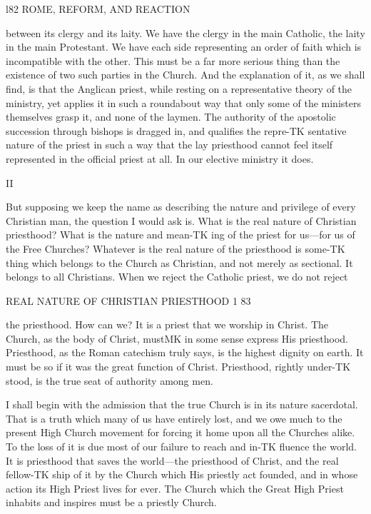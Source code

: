 \documentclass[12pt,a5paper,twoside]{book}
\begin{document}
{l82 ROME, REFORM, AND REACTION 

between its clergy and its laity. We have the clergy 
in the main Catholic, the laity in the main Protestant. 
We have each side representing an order of faith which 
is incompatible with the other. This must be a far 
more serious thing than the existence of two such 
parties in the Church. And the explanation of it, 
as we shall find, is that the Anglican priest, while 
resting on a representative theory of the ministry, yet 
applies it in such a roundabout way that only some of 
the ministers themselves grasp it, and none of the 
laymen. The authority of the apostolic succession 
through bishops is dragged in, and qualifies the repre-TK
sentative nature of the priest in such a way that the 
lay priesthood cannot feel itself represented in the 
official priest at all. In our elective ministry it 
does. 

II 

But supposing we keep the name as describing the 
nature and privilege of every Christian man, the 
question I would ask is. What is the real nature of 
Christian priesthood? What is the nature and mean-TK
ing of the priest for us---for us of the Free Churches? 
Whatever is the real nature of the priesthood is some-TK
thing which belongs to the Church as Christian, and 
not merely as sectional. It belongs to all Christians. 
When we reject the Catholic priest, we do not reject 



REAL NATURE OF CHRISTIAN PRIESTHOOD 1 83 

the priesthood. How can we? It is a priest that 
we worship in Christ. The Church, as the body of 
Christ, mustMK in some sense express His priesthood. 
Priesthood, as the Roman catechism truly says, is the 
highest dignity on earth. It must be so if it was the 
great function of Christ. Priesthood, rightly under-TK
stood, is the true seat of authority among men. 

I shall begin with the admission that the true 
Church is in its nature sacerdotal. That is a truth 
which many of us have entirely lost, and we owe much 
to the present High Church movement for forcing it 
home upon all the Churches alike. To the loss 
of it is due most of our failure to reach and in-TK
fluence the world. It is priesthood that saves the 
world---the priesthood of Christ, and the real fellow-TK
ship of it by the Church which His priestly act 
founded, and in whose action its High Priest lives 
for ever. The Church which the Great High Priest 
inhabits and inspires must be a priestly Church. 

}
\end{document}
